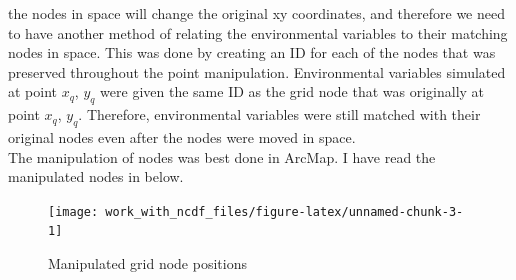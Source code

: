 \documentclass[
]{article}
\newenvironment{Shaded}{\begin{snugshade}}{\end{snugshade}}
\newcommand{\AttributeTok}[1]{\textcolor[rgb]{0.77,0.63,0.00}{#1}}
\newcommand{\CommentTok}[1]{\textcolor[rgb]{0.56,0.35,0.01}{\textit{#1}}}
\newcommand{\DecValTok}[1]{\textcolor[rgb]{0.00,0.00,0.81}{#1}}
\newcommand{\FloatTok}[1]{\textcolor[rgb]{0.00,0.00,0.81}{#1}}
\newcommand{\FunctionTok}[1]{\textcolor[rgb]{0.00,0.00,0.00}{#1}}
\newcommand{\NormalTok}[1]{#1}
\newcommand{\OtherTok}[1]{\textcolor[rgb]{0.56,0.35,0.01}{#1}}
\newcommand{\SpecialCharTok}[1]{\textcolor[rgb]{0.00,0.00,0.00}{#1}}
\newcommand{\StringTok}[1]{\textcolor[rgb]{0.31,0.60,0.02}{#1}}
\begin{document}
the nodes in space will change the original xy coordinates, and
therefore we need to have another method of relating the environmental
variables to their matching nodes in space. This was done by creating an
ID for each of the nodes that was preserved throughout the point
manipulation. Environmental variables simulated at point \(x_{q}\),
\(y_{q}\) were given the same ID as the grid node that was originally at
point \(x_{q}\), \(y_{q}\). Therefore, environmental variables were
still matched with their original nodes even after the nodes were moved
in space.\\
\hspace*{0.333em}\hspace*{0.333em}\hspace*{0.333em}\hspace*{0.333em}\hspace*{0.333em}\hspace*{0.333em}\hspace*{0.333em}The
manipulation of nodes was best done in ArcMap. I have read the
manipulated nodes in below.

\singlespacing

\begin{Shaded}
\end{Shaded}

\begin{figure}[H]
\texttt{[image: work\_with\_ncdf\_files/figure-latex/unnamed-chunk-3-1]} \caption{Manipulated grid node positions}\label{fig:unnamed-chunk-3}
\end{figure}
\end{document}
